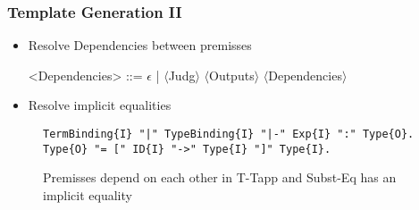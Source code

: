 \documentclass{beamer}
\begin{document}
\begin{frame}[fragile]
  \frametitle{Template Generation II}
\begin{itemize}
\item Resolve Dependencies between premisses
  \begin{grammar}
    <Dependencies> ::= $\epsilon$ | $\langle$Judg$\rangle$ $\langle$Outputs$\rangle$ $\langle$Dependencies$\rangle$
  \end{grammar}
\item Resolve implicit equalities
\end{itemize}

\begin{figure}
\begin{lstlisting}
TermBinding{I} "|" TypeBinding{I} "|-" Exp{I} ":" Type{O}.
Type{O} "= [" ID{I} "->" Type{I} "]" Type{I}.
\end{lstlisting}

\caption{Premisses depend on each other in T-Tapp and
  Subst-Eq has an implicit equality}
\end{figure}
\end{frame}

\renewcommand*\selectTemplateOptimization{orange}
\renewcommand*\selectTemplateOptimization{}
\end{document}
